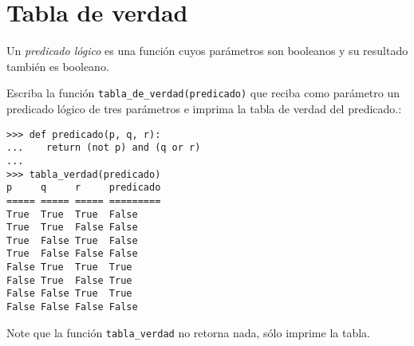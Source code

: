 \section{Tabla de verdad}

Un \emph{predicado lógico} es una función cuyos parámetros son
booleanos y su resultado también es booleano.

Escriba la función \lstinline!tabla_de_verdad(predicado)! que reciba
como parámetro un predicado lógico de tres parámetros e imprima la tabla
de verdad del predicado.:

\begin{lstlisting}
>>> def predicado(p, q, r):
...    return (not p) and (q or r)
...
>>> tabla_verdad(predicado)
p     q     r     predicado
===== ===== ===== =========
True  True  True  False
True  True  False False
True  False True  False
True  False False False
False True  True  True
False True  False True
False False True  True
False False False False
\end{lstlisting}

Note que la función \lstinline!tabla_verdad! no retorna nada, sólo
imprime la tabla.

